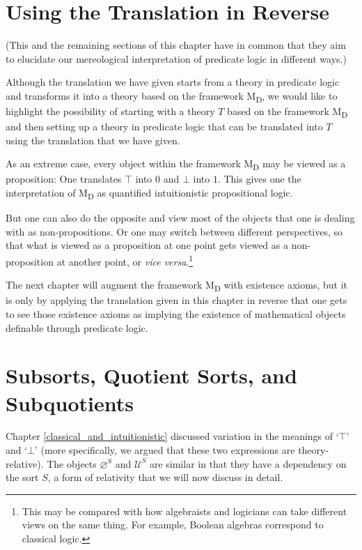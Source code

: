 \documentclass[12pt]{book}
\begin{document}
\section{Using the Translation in Reverse} \label{using_the_translation_in_reverse}
(This and the remaining sections of this chapter have in common that they aim to elucidate our mereological interpretation of predicate logic in different ways.)

Although the translation we have given starts from a theory in predicate logic and transforms it into a theory based on the framework M\textsubscript{D}, we would like to highlight the possibility of starting with a theory $T$ based on the framework M\textsubscript{D} and then setting up a theory in predicate logic that can be translated into $T$ using the translation that we have given.

As an extreme case, every object within the framework M\textsubscript{D} may be viewed as a proposition: One translates $\top$ into $0$ and $\bot$ into $1$. This gives one the interpretation of M\textsubscript{D} as quantified intuitionistic propositional logic.

But one can also do the opposite and view most of the objects that one is dealing with as non-propositions. Or one may switch between different perspectives, so that what is viewed as a proposition at one point gets viewed as a non-proposition at another point, or \textit{vice versa}.\footnote{This may be compared with how algebraists and logicians can take different views on the same thing. For example, Boolean algebras correspond to classical logic.}

The next chapter will augment the framework M\textsubscript{D} with existence axioms, but it is only by applying the translation given in this chapter in reverse that one gets to see those existence axioms as implying the existence of mathematical objects definable through predicate logic.

\section{Subsorts, Quotient Sorts, and Subquotients} \label{subsorts_etc}
Chapter \ref{classical_and_intuitionistic} discussed variation in the meanings of `$\top$' and `$\bot$' (more specifically, we argued that these two expressions are theory-relative). The objects $\varnothing^S$ and $\mathcal{U}^S$ are similar in that they have a dependency on the sort $S$, a form of relativity that we will now discuss in detail.
\end{document}
